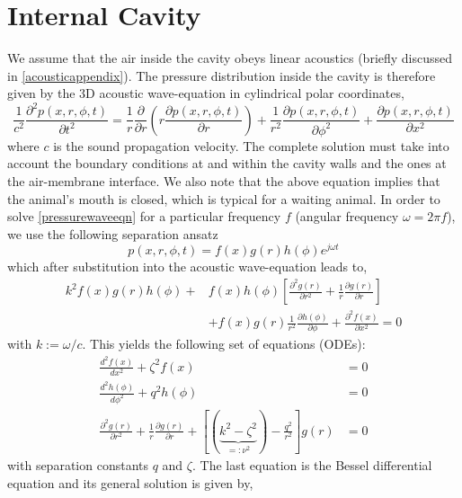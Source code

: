 \section{Internal Cavity}
We assume that the air inside the cavity obeys linear acoustics (briefly discussed in \ref{acousticappendix}). The pressure distribution inside the cavity
is therefore given by the $3$D acoustic wave-equation in cylindrical polar coordinates,	
\begin{equation}\label{pressurewaveeqn}
 \frac{1}{c^2}\frac{\partial^2 p(x,r,\phi,t)}{\partial t^2}=\frac{1}{r}\frac{\partial}{\partial r}\left(r\frac{\partial p(x,r,\phi,t)}{\partial r}\right)
 +\frac{1}{r^2}\frac{\partial p(x,r,\phi,t)}{\partial \phi^2}+\frac{\partial p(x,r,\phi,t)}{\partial x^2}
\end{equation}
where $c$ is the sound propagation velocity. The complete solution must take into account the boundary conditions at and within the cavity walls and the
ones at the air-membrane interface. We also note that the above equation implies that the animal's mouth is closed, which is typical for a waiting
animal. In order to solve \eqref{pressurewaveeqn} for a particular frequency $f$ (angular frequency $\omega=2\pi f$), we use the following
separation ansatz
\begin{equation}\label{pseparationansatz}
  p(x,r,\phi,t)=f(x)g(r)h(\phi)e^{j\omega t}
\end{equation}
which after substitution into the acoustic wave-equation leads to,
\begin{equation}\label{pseparationansatz2}
\begin{split}
 k^2f(x)g(r)h(\phi)+&f(x)h(\phi)\left[\frac{\partial^2 g(r)}{\partial r^2} + \frac{1}{r}\frac{\partial g(r)}{\partial r}\right] \\
 &+f(x)g(r)\frac{1}{r^2}\frac{\partial h(\phi)}{\partial \phi}+\frac{\partial^2 f(x)}{\partial x^2}=0
\end{split}
\end{equation}
with $k:=\omega/c$. This yields the following set of equations (ODEs):
\begin{align}
 \frac{d^2 f(x)}{dx^2}+\zeta^2f(x)&=0\\
 \frac{d^2 h(\phi)}{d\phi^2}+q^2h(\phi	)&=0\\
 \frac{\partial^2 g(r)}{\partial r^2} + \frac{1}{r}\frac{\partial g(r)}{\partial r}+\left[(\displaystyle\underbrace{k^2-\zeta^2}_{=:\nu^2})-\frac{q^2}{r^2}\right]g(r)&=0\label{besselequation1}
\end{align}
with separation constants $q$ and $\zeta$. The last equation is the Bessel differential equation \cite[p.~313]{copsonbessel} and its general solution is given by,
